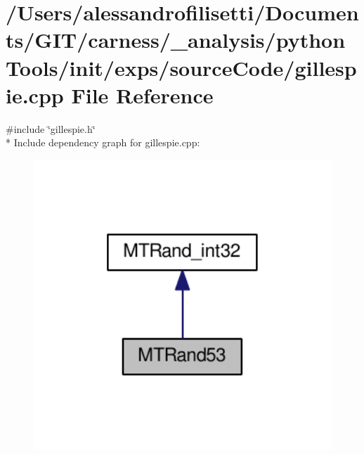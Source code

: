 \hypertarget{a00064}{\section{/\-Users/alessandrofilisetti/\-Documents/\-G\-I\-T/carness/\-\_\-analysis/python\-Tools/init/exps/source\-Code/gillespie.cpp File Reference}
\label{a00064}
}
{\ttfamily \#include \char`\"{}gillespie.\-h\char`\"{}}\\*
Include dependency graph for gillespie.\-cpp\-:
\nopagebreak
\begin{figure}[H]
\begin{center}
\leavevmode
\includegraphics[width=350pt]{a00182}
\end{center}
\end{figure}
